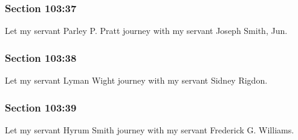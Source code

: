 	\subsubsection{Section 103:37} %
		\label{DC103-37}

		Let my servant Parley P. Pratt journey with my servant Joseph Smith, Jun.


	\subsubsection{Section 103:38} %
		\label{DC103-38}

		Let my servant Lyman Wight journey with my servant Sidney Rigdon.


	\subsubsection{Section 103:39} %
		\label{DC103-39}

		Let my servant Hyrum Smith journey with my servant Frederick G. Williams.


